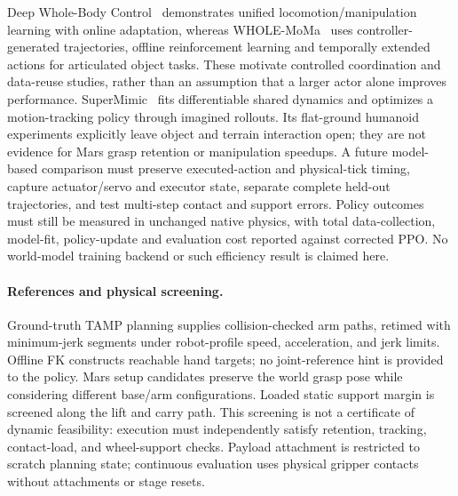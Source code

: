 Deep Whole-Body Control~\cite{fu2023deepwholebody} demonstrates unified
locomotion/manipulation learning with online adaptation, whereas
WHOLE-MoMa~\cite{jauhri2026wholemoma} uses controller-generated trajectories,
offline reinforcement learning and temporally extended actions for articulated
object tasks. These motivate controlled coordination and data-reuse studies,
rather than an assumption that a larger actor alone improves performance.
SuperMimic~\cite{liao2026supermimic} fits differentiable shared dynamics and
optimizes a motion-tracking policy through imagined rollouts. Its flat-ground
humanoid experiments explicitly leave object and terrain interaction open;
they are not evidence for Mars grasp retention or manipulation speedups.
A future model-based comparison must preserve executed-action and physical-tick
timing, capture actuator/servo and executor state, separate complete held-out
trajectories, and test multi-step contact and support errors. Policy outcomes
must still be measured in unchanged native physics, with total data-collection,
model-fit, policy-update and evaluation cost reported against corrected PPO.
No world-model training backend or such efficiency result is claimed here.

\paragraph{References and physical screening.}
Ground-truth TAMP planning supplies collision-checked arm paths, retimed with
minimum-jerk segments under robot-profile speed, acceleration, and jerk limits.
Offline FK constructs reachable hand targets; no joint-reference hint is
provided to the policy. Mars setup candidates preserve the world grasp pose
while considering different base/arm configurations. Loaded static support
margin is screened along the lift and carry path. This screening is not a
certificate of dynamic feasibility: execution must independently satisfy
retention, tracking, contact-load, and wheel-support checks. Payload attachment
is restricted to scratch planning state; continuous evaluation uses physical
gripper contacts without attachments or stage resets.

